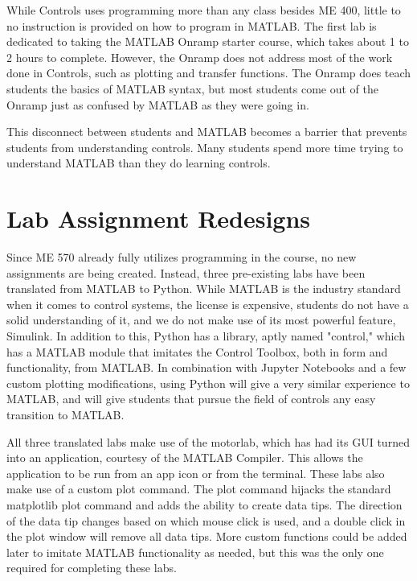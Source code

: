 While Controls uses programming more than any class besides ME 400, little to no instruction is provided on how to program in MATLAB.
The first lab is dedicated to taking the MATLAB Onramp starter course, which takes about 1 to 2 hours to complete. However, the 
Onramp does not address most of the work done in Controls, such as plotting and transfer functions. The Onramp does teach students
the basics of MATLAB syntax, but most students come out of the Onramp just as confused by MATLAB as they were going in.

This disconnect between students and MATLAB becomes a barrier that prevents students from understanding controls. Many students
spend more time trying to understand MATLAB than they do learning controls. 

\section{Lab Assignment Redesigns}

Since ME 570 already fully utilizes programming in the course, no new assignments are being created. Instead, three pre-existing
labs have been translated from MATLAB to Python. While MATLAB is the industry standard when it comes to control systems, the
license is expensive, students do not have a solid understanding of it, and we do not make use of its most powerful feature,
Simulink. In addition to this, Python has a library, aptly named "control," which has a MATLAB module that imitates the Control
Toolbox, both in form and functionality, from MATLAB. In combination with Jupyter Notebooks and a few custom plotting modifications,
using Python will give a very similar experience to MATLAB, and will give students that pursue the field of controls any easy
transition to MATLAB. 

All three translated labs make use of the motorlab, which has had its GUI turned into an application, courtesy of the MATLAB
Compiler. This allows the application to be run from an app icon or from the terminal. These labs also make use of a custom plot
command. The plot command hijacks the standard matplotlib \cite{Hunter_Matplotlib_A_2D_2007} plot command and adds the ability to 
create data tips. The direction of the data tip changes based on which mouse click is used, and a double click in the plot window 
will remove all data tips. More custom functions could be added later to imitate MATLAB functionality as needed, but this was the 
only one required for completing these labs.

